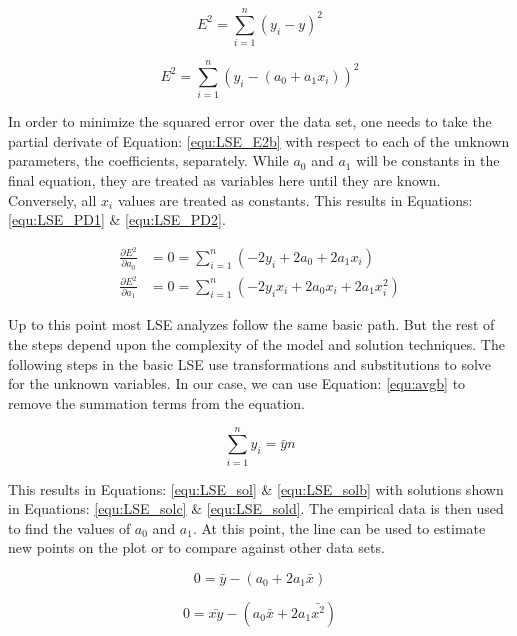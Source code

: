 \begin{equation}
    \label{equ:LSE_E2}
    E^2 = \sum_{i=1}^{n} (y_i - y)^2
\end{equation}

\begin{equation}
    \label{equ:LSE_E2b}
    E^2 = \sum_{i=1}^{n} (y_i - (a_0 + a_1 x_i))^2
\end{equation}

In order to minimize the squared error over the data set, one needs to take the partial derivate of Equation: \eqref{equ:LSE_E2b} with respect to each of the unknown parameters, the coefficients, separately. While $a_0$ and $a_1$ will be constants in the final equation, they are treated as variables here until they are known. Conversely, all $x_i$ values are treated as constants. This results in Equations: \eqref{equ:LSE_PD1} \& \eqref{equ:LSE_PD2}.

\begin{align} 
    \frac{\partial E^2}{\partial a_0} &= 0 = \sum_{i=1}^{n} (-2y_i +2a_0 + 2a_1 x_i)           \label{equ:LSE_PD1} \\
    \frac{\partial E^2}{\partial a_1} &= 0 = \sum_{i=1}^{n} (-2y_i x_i +2a_0 x_i + 2a_1 x_i^2) \label{equ:LSE_PD2}
\end{align}

Up to this point most LSE analyzes follow the same basic path. But the rest of the steps depend upon the complexity of the model and solution techniques. The following steps in the basic LSE use transformations and substitutions to solve for the unknown variables. In our case, we can use Equation: \eqref{equ:avgb} to remove the summation terms from the equation.

\begin{equation}
    \label{equ:avgb} 
    \sum_{i=1}^{n} y_i  = \bar{y}n
\end{equation}

This results in Equations: \eqref{equ:LSE_sol} \& \eqref{equ:LSE_solb} with solutions shown in Equations: \eqref{equ:LSE_solc} \& \eqref{equ:LSE_sold}. The empirical data is then used to find the values of $a_0$ and $a_1$. At this point, the line can be used to estimate new points on the plot or to compare against other data sets.

\begin{equation}
    \label{equ:LSE_sol}
    0 = \bar{y} - (a_0 + 2a_1 \bar{x})
\end{equation}

\begin{equation}
    \label{equ:LSE_solb}
    0 = \bar{xy} - (a_0 \bar{x} + 2a_1 \bar{x^2})
\end{equation}

